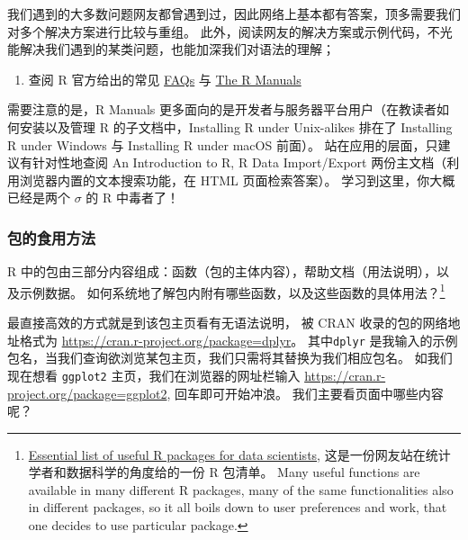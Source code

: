 \documentclass[11pt,hyperref]{ctexart}
\providecommand{\tightlist}{%
  \setlength{\itemsep}{0pt}\setlength{\parskip}{0pt}}
\begin{document}
我们遇到的大多数问题网友都曾遇到过，因此网络上基本都有答案，顶多需要我们对多个解决方案进行比较与重组。
此外，阅读网友的解决方案或示例代码，不光能解决我们遇到的某类问题，也能加深我们对语法的理解；

\begin{enumerate}
\def\labelenumi{\arabic{enumi}.}
\setcounter{enumi}{2}
\tightlist
\item
  查阅 R 官方给出的常见
  \href{https://mirrors.tuna.tsinghua.edu.cn/CRAN/faqs.html}{FAQs} 与
  \href{https://mirrors.tuna.tsinghua.edu.cn/CRAN/manuals.html}{The R
  Manuals}
\end{enumerate}

需要注意的是，R Manuals
更多面向的是开发者与服务器平台用户（在教读者如何安装以及管理 R
的子文档中，Installing R under Unix-alikes 排在了 Installing R under
Windows 与 Installing R under macOS 前面）。
站在应用的层面，只建议有针对性地查阅 An Introduction to R, R Data
Import/Export 两份主文档（利用浏览器内置的文本搜索功能，在 HTML
页面检索答案）。 学习到这里，你大概已经是两个 \(\sigma\) 的 R 中毒者了！

\hypertarget{ux5305ux7684ux98dfux7528ux65b9ux6cd5}{%
\subsubsection{包的食用方法}\label{ux5305ux7684ux98dfux7528ux65b9ux6cd5}}

R
中的包由三部分内容组成：函数（包的主体内容），帮助文档（用法说明），以及示例数据。
如何系统地了解包内附有哪些函数，以及这些函数的具体用法？\footnote{\href{https://www.r-bloggers.com/essential-list-of-useful-r-packages-for-data-scientists/}{Essential
  list of useful R packages for data scientists},
  这是一份网友站在统计学者和数据科学的角度给的一份 R 包清单。 Many
  useful functions are available in many different R packages, many of
  the same functionalities also in different packages, so it all boils
  down to user preferences and work, that one decides to use particular
  package.}

最直接高效的方式就是到该包主页看有无语法说明， 被 CRAN
收录的包的网络地址格式为
\url{https://cran.r-project.org/package=dplyr}。 其中\texttt{dplyr}
是我输入的示例包名，当我们查询欲浏览某包主页，我们只需将其替换为我们相应包名。
如我们现在想看 \texttt{ggplot2} 主页，我们在浏览器的网址栏输入
\url{https://cran.r-project.org/package=ggplot2}, 回车即可开始冲浪。
我们主要看页面中哪些内容呢？
\end{document}

